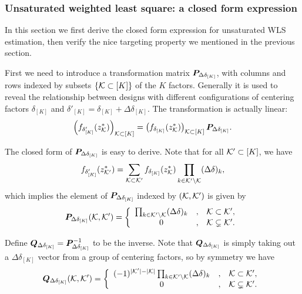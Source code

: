\documentclass[12pt]{article}
\begin{document}
\subsubsection{Unsaturated weighted least square: a closed form expression}

In this section we first derive the closed form expression for unsaturated WLS estimation, then verify the nice targeting property we mentioned in the previous section. 

First we need to introduce a transformation matrix ${\boldsymbol{P}}_{\Delta\delta_{[K]}}$, with columns and rows indexed by subsets $\{{\mathcal{K}}\subset [K]\}$ of the $K$ factors. Generally it is used to reveal the relationship between designs with different configurations of centering factors $\delta_{[K]}$ and $\delta'_{[K]} = \delta_{[K]}+\Delta\delta_{[K]}$. The transformation is actually linear:
\begin{align}
    \left(f_{\delta'_{[K]}}(z^*_{\mathcal{K}})\right)_{{\mathcal{K}}\subset [K]} = \left(f_{\delta_{[K]}}(z^*_{\mathcal{K}})\right)_{{\mathcal{K}}\subset [K]} {\boldsymbol{P}}_{\Delta\delta_{[K]}}.
\end{align}

The closed form of ${\boldsymbol{P}}_{\Delta\delta_{[K]}}$ is easy to derive.  Note that for all ${\mathcal{K}}'\subset [K]$, we have 
\begin{align}
    f_{\delta'_{[K]}}(z^*_{{\mathcal{K}}'}) = \sum_{{\mathcal{K}}\subset {\mathcal{K}}'}f_{\delta_{[K]}}(z^*_{{\mathcal{K}}}) \prod_{k\in {\mathcal{K}}'\backslash {\mathcal{K}}}(\Delta\delta)_k, \notag
\end{align}
which implies the element of ${\boldsymbol{P}}_{\Delta\delta_{[K]}}$ indexed by $({\mathcal{K}}, {\mathcal{K}}')$ is given by
\begin{align}\label{eqn:Pmatrix}
{\boldsymbol{P}}_{\Delta\delta_{[K]}}({\mathcal{K}},{\mathcal{K}}')=\left\{
\begin{array}{ccc}
    \prod_{k\in {\mathcal{K}}'\backslash {\mathcal{K}}}(\Delta\delta)_k &, & {\mathcal{K}}\subset{\mathcal{K}}', \\
     0 &, & {\mathcal{K}}\subsetneq {\mathcal{K}}'. 
\end{array}
\right.
\end{align}

Define ${\boldsymbol{Q}}_{\Delta\delta_{[K]}} = {\boldsymbol{P}}_{\Delta\delta_{[K]}}^{-1}$ to be the inverse. Note that ${\boldsymbol{Q}}_{\Delta\delta_{[K]}}$ is simply taking out a $\Delta\delta_{[K]}$ vector from a group of centering factors, so by symmetry we have 
\begin{align}\label{eqn:Qmatrix}
    {\boldsymbol{Q}}_{\Delta\delta_{[K]}}({\mathcal{K}},{\mathcal{K}}') = \left\{
\begin{array}{ccc}
    (-1)^{|{\mathcal{K}}'|-|{\mathcal{K}}|}\prod_{k\in {\mathcal{K}}'\backslash {\mathcal{K}}}(\Delta\delta)_k &, & {\mathcal{K}}\subset{\mathcal{K}}', \\
     0 &, & {\mathcal{K}}\subsetneq {\mathcal{K}}'. 
\end{array}
\right.
\end{align}
\end{document}
